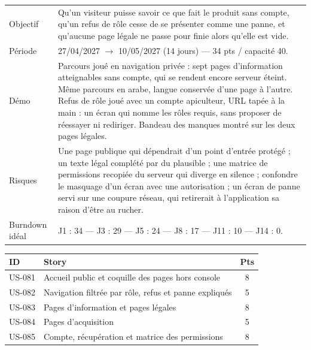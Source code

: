 \begin{center}
\begin{tabular}{lp{11cm}}
\toprule
Objectif  & Qu'un visiteur puisse savoir ce que fait le produit sans compte,
            qu'un refus de rôle cesse de se présenter comme une panne, et
            qu'aucune page légale ne passe pour finie alors qu'elle est vide. \\
Période   & 27/04/2027 $\rightarrow$ 10/05/2027 (14 jours) --- 34 pts / capacité 40. \\
Démo      & Parcours joué en navigation privée : sept pages d'information
            atteignables sans compte, qui se rendent encore serveur éteint.
            Même parcours en arabe, langue conservée d'une page à l'autre.
            Refus de rôle joué avec un compte apiculteur, URL tapée à la main :
            un écran qui nomme les rôles requis, sans proposer de réessayer ni
            rediriger. Bandeau des manques montré sur les deux pages légales. \\
Risques   & Une page publique qui dépendrait d'un point d'entrée protégé ; un
            texte légal complété par du plausible ; une matrice de permissions
            recopiée du serveur qui diverge en silence ; confondre le masquage
            d'un écran avec une autorisation ; un écran de panne servi sur une
            coupure réseau, qui retirerait à l'application sa raison d'être au
            rucher. \\
Burndown idéal & J1 : 34 --- J3 : 29 --- J5 : 24 --- J8 : 17 --- J11 : 10 --- J14 : 0. \\
\bottomrule
\end{tabular}
\end{center}

\begin{center}
\begin{tabular}{lp{9cm}c}
\toprule
\textbf{ID} & \textbf{Story} & \textbf{Pts} \\
\midrule
US-081 & Accueil public et coquille des pages hors console   & 8 \\
US-082 & Navigation filtrée par rôle, refus et panne expliqués & 5 \\
US-083 & Pages d'information et pages légales                & 8 \\
US-084 & Pages d'acquisition                                 & 5 \\
US-085 & Compte, récupération et matrice des permissions      & 8 \\
\bottomrule
\end{tabular}
\end{center}


